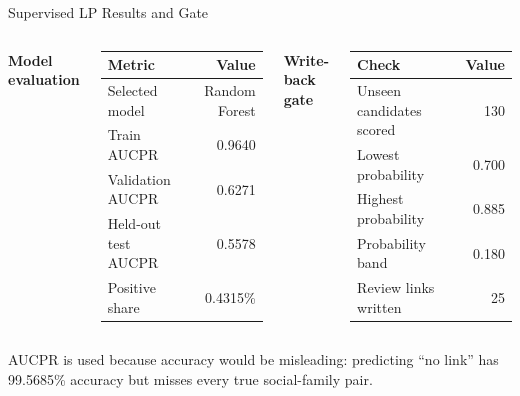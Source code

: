 ﻿\documentclass[aspectratio=169]{beamer}
\begin{document}
\begin{frame}{Supervised LP Results and Gate}
  \small
  \begin{columns}[T]
      \textbf{Model evaluation}\\[3pt]
      \begin{tabular}{lr}
        \toprule
        \textbf{Metric} & \textbf{Value} \\
        \midrule
        Selected model & Random Forest \\
        Train AUCPR & 0.9640 \\
        Validation AUCPR & 0.6271 \\
        Held-out test AUCPR & 0.5578 \\
        Positive share & 0.4315\% \\
        \bottomrule
      \end{tabular}

      \textbf{Write-back gate}\\[3pt]
      \begin{tabular}{lr}
        \toprule
        \textbf{Check} & \textbf{Value} \\
        \midrule
        Unseen candidates scored & 130 \\
        Lowest probability & 0.700 \\
        Highest probability & 0.885 \\
        Probability band & 0.180 \\
        Review links written & 25 \\
        \bottomrule
      \end{tabular}
  \end{columns}

  \vspace{0.18cm}
  AUCPR is used because accuracy would be misleading: predicting ``no link'' has 99.5685\% accuracy but misses every true social-family pair.
\end{frame}
\end{document}

